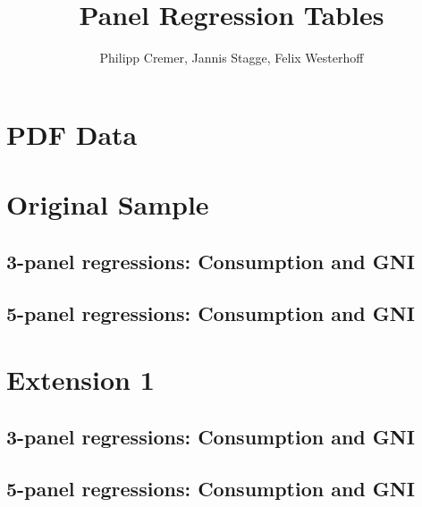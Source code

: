 \documentclass{article}
\title{Panel Regression Tables}
\author{Philipp Cremer, Jannis Stagge, Felix Westerhoff}
\begin{document}
\maketitle

\section{PDF Data}






\clearpage
\section{Original Sample}

\subsection*{3-panel regressions: Consumption and GNI}


\FloatBarrier

\clearpage
\subsection*{5-panel regressions: Consumption and GNI}


\FloatBarrier



\clearpage
\section{Extension 1}

\subsection*{3-panel regressions: Consumption and GNI}


\FloatBarrier

\clearpage
\subsection*{5-panel regressions: Consumption and GNI}


\FloatBarrier
\end{document}
